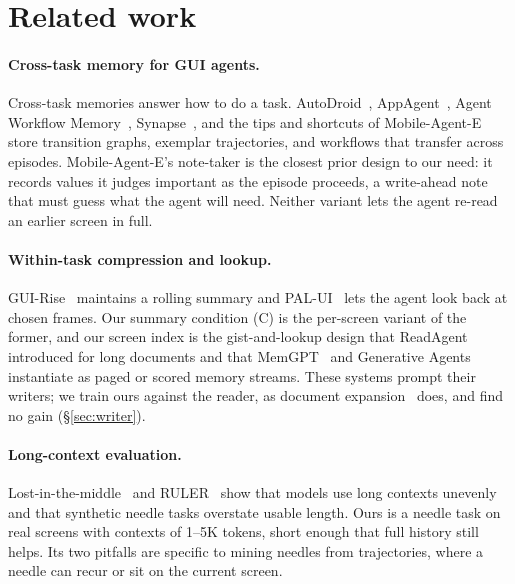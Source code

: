 \section{Related work}
\label{sec:related}
\paragraph{Cross-task memory for GUI agents.} Cross-task memories answer how to do a task. AutoDroid~\citep{autodroid}, AppAgent~\citep{appagent}, Agent Workflow Memory~\citep{awm}, Synapse~\citep{synapse}, and the tips and shortcuts of Mobile-Agent-E~\citep{mobileagente} store transition graphs, exemplar trajectories, and workflows that transfer across episodes. Mobile-Agent-E's note-taker is the closest prior design to our need: it records values it judges important as the episode proceeds, a write-ahead note that must guess what the agent will need. Neither variant lets the agent re-read an earlier screen in full.

\paragraph{Within-task compression and lookup.} GUI-Rise~\citep{guirise} maintains a rolling summary and PAL-UI~\citep{palui} lets the agent look back at chosen frames. Our summary condition (C) is the per-screen variant of the former, and our screen index is the gist-and-lookup design that ReadAgent~\citep{readagent} introduced for long documents and that MemGPT~\citep{memgpt} and Generative Agents~\citep{generativeagents} instantiate as paged or scored memory streams. These systems prompt their writers; we train ours against the reader, as document expansion~\citep{doc2query} does, and find no gain (\S\ref{sec:writer}).

\paragraph{Long-context evaluation.} Lost-in-the-middle~\citep{lostmiddle} and RULER~\citep{ruler} show that models use long contexts unevenly and that synthetic needle tasks overstate usable length. Ours is a needle task on real screens with contexts of 1--5K tokens, short enough that full history still helps. Its two pitfalls are specific to mining needles from trajectories, where a needle can recur or sit on the current screen.
